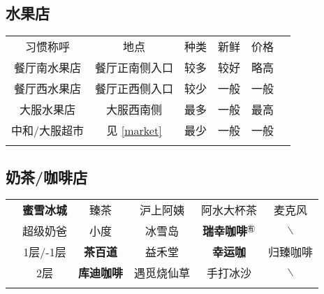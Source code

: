\subsection[水果店]{水果店}
\begin{table}[H]
    \centering
    \begin{tabular}{|c|c|c|c|c|c|}
        \Xhline{1.2pt}
        习惯称呼    & 地点                     & 种类 & 新鲜 & 价格 \\
        \Xhline{1.2pt}
        餐厅南水果店  & 餐厅正南侧入口                & 较多 & 较好 & 略高 \\
        \hline
        餐厅西水果店  & 餐厅正西侧入口                & 较少 & 一般 & 一般 \\
        \hline
        大服水果店   & 大服西南侧                  & 最多 & 一般 & 最高 \\
        \hline
        中和/大服超市 & 见 \uline{\ref{market}} & 最少 & 一般 & 一般 \\
        \Xhline{1.2pt}
    \end{tabular}
\end{table}

\subsection[奶茶/咖啡店]{奶茶/咖啡店}
\begin{table}[H]
    \centering
    \begin{tabular}{|c|c|c|c|c|c|}
        \Xhline{1.2pt}
        \multirow{2}{*}{食堂} & \textbf{蜜雪冰城}       & 臻茶            & 沪上阿姨  %
                            & 阿水大杯茶               & 麦克风                   \\
        \cline{2-6}
                            & 超级奶爸                & 小度            & 冰雪岛   %
                            & \textbf{瑞幸咖啡}$^{㊒}$ & $\backslash$          \\
        \Xhline{1.2pt}
        \multirow{2}{*}{大服} & 1层/-1层              & \textbf{茶百道}  & 益禾堂   %
                            & \textbf{幸运咖}        & 归臻咖啡                  \\
        \cline{2-6}
                            & 2层                  & \textbf{库迪咖啡} & 遇觅烧仙草 %
                            & 手打冰沙                & $\backslash$          \\
        \Xhline{1.2pt}
    \end{tabular}
\end{table}

